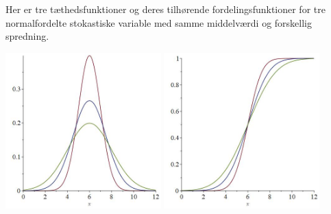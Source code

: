 Her er tre tæthedsfunktioner og deres tilhørende fordelingsfunktioner for tre normalfordelte stokastiske variable med samme middelværdi og forskellig spredning. 
\begin{center}
	\includegraphics[width=0.45\textwidth]{Billeder/3gauss.jpg}
	\includegraphics[width=0.45\textwidth]{Billeder/3fordeling.jpg}
\end{center}
